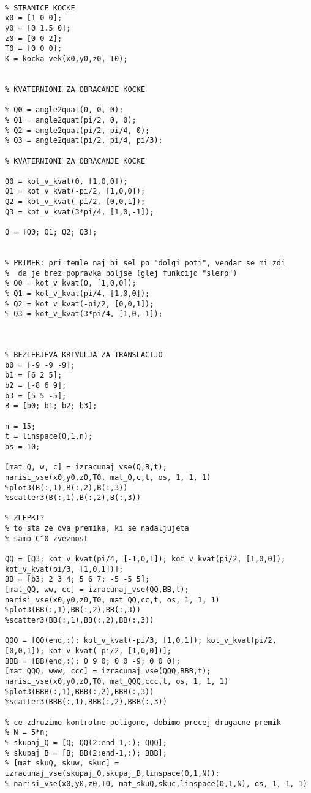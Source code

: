 \documentclass[12pt,a4paper,twoside]{article}
\theoremstyle{definition} %
\theoremstyle{plain} %
\numberwithin{equation}{section}  %
\begin{document}
\begin{lstlisting}[caption = {}]
% definicija kocke

% STRANICE KOCKE
x0 = [1 0 0];
y0 = [0 1.5 0];
z0 = [0 0 2];
T0 = [0 0 0];
K = kocka_vek(x0,y0,z0, T0);


% KVATERNIONI ZA OBRACANJE KOCKE

% Q0 = angle2quat(0, 0, 0);
% Q1 = angle2quat(pi/2, 0, 0);
% Q2 = angle2quat(pi/2, pi/4, 0);
% Q3 = angle2quat(pi/2, pi/4, pi/3);

% KVATERNIONI ZA OBRACANJE KOCKE

Q0 = kot_v_kvat(0, [1,0,0]);
Q1 = kot_v_kvat(-pi/2, [1,0,0]);
Q2 = kot_v_kvat(-pi/2, [0,0,1]);
Q3 = kot_v_kvat(3*pi/4, [1,0,-1]);

Q = [Q0; Q1; Q2; Q3];


% PRIMER: pri temle naj bi sel po "dolgi poti", vendar se mi zdi
%  da je brez popravka boljse (glej funkcijo "slerp")
% Q0 = kot_v_kvat(0, [1,0,0]);
% Q1 = kot_v_kvat(pi/4, [1,0,0]);
% Q2 = kot_v_kvat(-pi/2, [0,0,1]);
% Q3 = kot_v_kvat(3*pi/4, [1,0,-1]);



% BEZIERJEVA KRIVULJA ZA TRANSLACIJO
b0 = [-9 -9 -9];
b1 = [6 2 5];
b2 = [-8 6 9];
b3 = [5 5 -5];
B = [b0; b1; b2; b3];

n = 15;
t = linspace(0,1,n);
os = 10;

[mat_Q, w, c] = izracunaj_vse(Q,B,t);
narisi_vse(x0,y0,z0,T0, mat_Q,c,t, os, 1, 1, 1)
%plot3(B(:,1),B(:,2),B(:,3))
%scatter3(B(:,1),B(:,2),B(:,3))

% ZLEPKI?
% to sta ze dva premika, ki se nadaljujeta 
% samo C^0 zveznost

QQ = [Q3; kot_v_kvat(pi/4, [-1,0,1]); kot_v_kvat(pi/2, [1,0,0]); kot_v_kvat(pi/3, [1,0,1])]; 
BB = [b3; 2 3 4; 5 6 7; -5 -5 5];
[mat_QQ, ww, cc] = izracunaj_vse(QQ,BB,t);
narisi_vse(x0,y0,z0,T0, mat_QQ,cc,t, os, 1, 1, 1)
%plot3(BB(:,1),BB(:,2),BB(:,3))
%scatter3(BB(:,1),BB(:,2),BB(:,3))

QQQ = [QQ(end,:); kot_v_kvat(-pi/3, [1,0,1]); kot_v_kvat(pi/2, [0,0,1]); kot_v_kvat(-pi/2, [1,0,0])]; 
BBB = [BB(end,:); 0 9 0; 0 0 -9; 0 0 0];
[mat_QQQ, www, ccc] = izracunaj_vse(QQQ,BBB,t);
narisi_vse(x0,y0,z0,T0, mat_QQQ,ccc,t, os, 1, 1, 1)
%plot3(BBB(:,1),BBB(:,2),BBB(:,3))
%scatter3(BBB(:,1),BBB(:,2),BBB(:,3))

% ce zdruzimo kontrolne poligone, dobimo precej drugacne premik
% N = 5*n;
% skupaj_Q = [Q; QQ(2:end-1,:); QQQ];
% skupaj_B = [B; BB(2:end-1,:); BBB];
% [mat_skuQ, skuw, skuc] = izracunaj_vse(skupaj_Q,skupaj_B,linspace(0,1,N));
% narisi_vse(x0,y0,z0,T0, mat_skuQ,skuc,linspace(0,1,N), os, 1, 1, 1)
\end{lstlisting}
\end{document}
